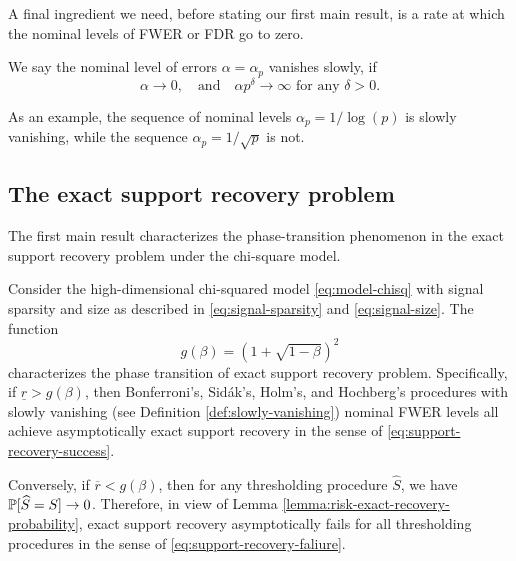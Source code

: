 


A final ingredient we need, before stating our first main result, is a rate at which the nominal levels of FWER or FDR go to zero.
\begin{definition} \label{def:slowly-vanishing}
We say the nominal level of errors $\alpha = \alpha_p$ vanishes slowly, if
\begin{equation} \label{eq:slowly-vanishing-error}
    \alpha\to 0,\quad \text{and} \quad \alpha p^\delta\to\infty \text{  for any } \delta>0.
\end{equation}
\end{definition}
As an example, the sequence of nominal levels $\alpha_p = 1/\log{(p)}$ is slowly vanishing, while the sequence $\alpha_p = 1/\sqrt{p}$ is not.

\subsection{The exact support recovery problem}
\label{subsec:exact-support-recovery-boundary}

The first main result characterizes the phase-transition phenomenon in the exact support recovery problem under the chi-square model.

\begin{theorem} \label{thm:chi-squared-exact-boundary}
Consider the high-dimensional chi-squared model \eqref{eq:model-chisq} with signal sparsity and size as described in \eqref{eq:signal-sparsity} and \eqref{eq:signal-size}.
The function 
\begin{equation} \label{eq:exact-boundary-chisquared}
    g(\beta) = \left(1 + \sqrt{1-\beta}\right)^2
\end{equation}
characterizes the phase transition of exact support recovery problem.
Specifically, if $\underline{r} > {{g}}(\beta)$, then Bonferroni's, Sid\'ak's, Holm's, and Hochberg's procedures with slowly vanishing (see Definition \ref{def:slowly-vanishing}) nominal FWER levels all achieve asymptotically exact support recovery in the sense of \eqref{eq:support-recovery-success}. 

Conversely, if $\overline{r} < {{g}}(\beta)$, then for any thresholding procedure $\widehat{S}$, we have $\P[\widehat{S}=S]\to0$.
Therefore, in view of Lemma \ref{lemma:risk-exact-recovery-probability}, exact support recovery asymptotically fails for all thresholding procedures in the sense of \eqref{eq:support-recovery-faliure}.
\end{theorem}


